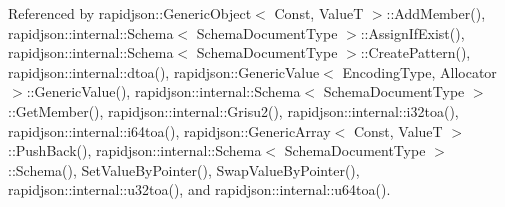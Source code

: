 Referenced by rapidjson\+::\+Generic\+Object$<$ Const, Value\+T $>$\+::\+Add\+Member(), rapidjson\+::internal\+::\+Schema$<$ Schema\+Document\+Type $>$\+::\+Assign\+If\+Exist(), rapidjson\+::internal\+::\+Schema$<$ Schema\+Document\+Type $>$\+::\+Create\+Pattern(), rapidjson\+::internal\+::dtoa(), rapidjson\+::\+Generic\+Value$<$ Encoding\+Type, Allocator $>$\+::\+Generic\+Value(), rapidjson\+::internal\+::\+Schema$<$ Schema\+Document\+Type $>$\+::\+Get\+Member(), rapidjson\+::internal\+::\+Grisu2(), rapidjson\+::internal\+::i32toa(), rapidjson\+::internal\+::i64toa(), rapidjson\+::\+Generic\+Array$<$ Const, Value\+T $>$\+::\+Push\+Back(), rapidjson\+::internal\+::\+Schema$<$ Schema\+Document\+Type $>$\+::\+Schema(), Set\+Value\+By\+Pointer(), Swap\+Value\+By\+Pointer(), rapidjson\+::internal\+::u32toa(), and rapidjson\+::internal\+::u64toa().

